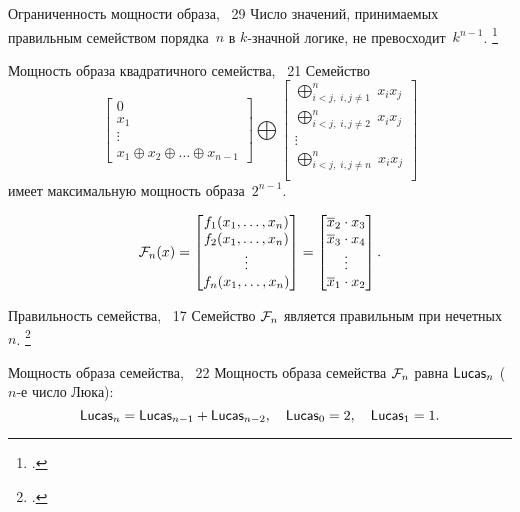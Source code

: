 \begin{frame}
    \begin{mypropos}{Ограниченность мощности образа, \propos~29}
        Число значений, принимаемых правильным семейством порядка~$n$ в $k$-значной логике, не превосходит~$k^{n-1}$.
        \footcitetext{galatenko23}
    \end{mypropos}
    \pause 
    \begin{mytheorem}{Мощность образа квадратичного семейства, \thm~21}
        Семейство 
        \[
            \begin{bmatrix}
            0 \\
            x_1 \\
            \vdots \\
            x_1 \oplus x_2 \oplus \ldots \oplus x_{n-1}
            \end{bmatrix}
            \bigoplus
            \begin{bmatrix}
            \bigoplus_{i < j, \; i, j \ne 1}^n \; x_i x_j \\
            \bigoplus_{i < j, \; i, j \ne 2}^n \; x_i x_j \\
            \vdots \\
            \bigoplus_{i < j, \; i, j \ne n}^n \; x_i x_j \\
            \end{bmatrix}
        \]
        имеет максимальную мощность образа~$2^{n-1}$.
    \end{mytheorem}
\end{frame}


\begin{frame}%
    \[
        \mathcal{F}_n(x) = 
        \begin{bmatrix}
            f_1(x_1, \ldots, x_n) \\
            f_2(x_1, \ldots, x_n) \\
            \vdots \\
            f_n(x_1, \ldots, x_n) \\
        \end{bmatrix}
        =
        \begin{bmatrix}
            \overline{x}_2 \cdot x_3 \\
            \overline{x}_3 \cdot x_4 \\
            \vdots \\
            \overline{x}_1 \cdot x_2 \\
        \end{bmatrix}.
    \]
    \begin{mypropos}{Правильность семейства, \rema~17}
        Семейство $\mathcal{F}_n$ является правильным при нечетных $n$.
        \footcitetext{galatenko20quad}
    \end{mypropos}
    \pause
    \begin{mytheorem}{Мощность образа семейства, \thm~22}
        Мощность образа семейства $\mathcal{F}_n$ равна $\mathsf{Lucas}_n$ ($n$-е число Люка):
        \[
            \mathsf{Lucas}_n = \mathsf{Lucas}_{n-1} + \mathsf{Lucas}_{n-2}, \quad \mathsf{Lucas}_0 = 2, \quad \mathsf{Lucas}_1 = 1.
        \]
    \end{mytheorem}
\end{frame}



